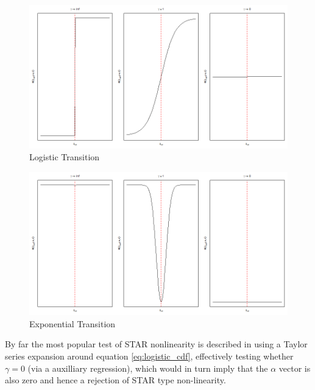\begin{figure}[ht]
\centering
\includegraphics[scale=0.35]{logistic}
\caption{Logistic Transition}
\label{fig:lstar}
\end{figure}
\begin{figure}[ht]
\centering
\includegraphics[scale=0.35]{exponential}
\caption{Exponential Transition}
\label{fig:estar}
\end{figure}

By far the most popular test of STAR nonlinearity is described in
\cite{Luukkonen1988} using a Taylor series expansion around equation 
\ref{eq:logistic_cdf}, effectively testing whether $\gamma=0$ (via a auxilliary
regression), which would in turn imply that the $\alpha$ vector is also zero
and hence a rejection of STAR type non-linearity.

